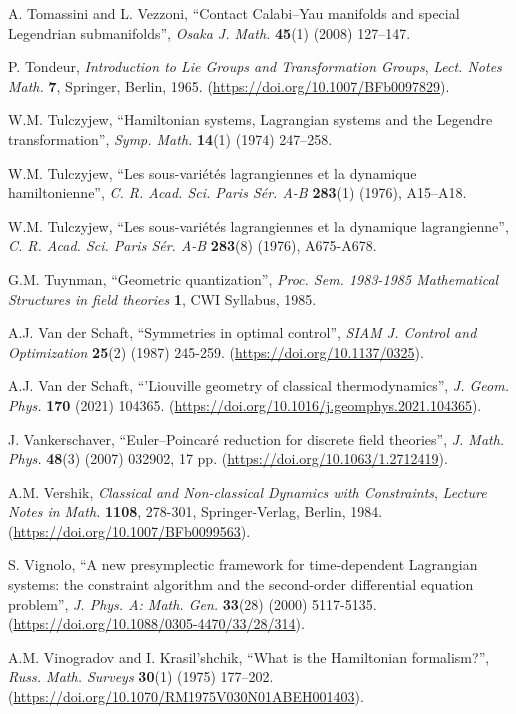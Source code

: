 \documentclass[12pt]{report}
\begin{document}
\begin{thebibliography}{999}
A. Tomassini and L. Vezzoni, 
``Contact Calabi--Yau manifolds and special Legendrian submanifolds'',
{\sl Osaka J. Math.} {\bf 45}(1) (2008) 127--147.

P. Tondeur, {\it Introduction to Lie Groups and Transformation Groups}, {\sl Lect. Notes Math.} {\bf 7}, Springer, Berlin, 1965.
(\url{https://doi.org/10.1007/BFb0097829}).

W.M. Tulczyjew, 
``Hamiltonian systems, Lagrangian systems and the Legendre transformation'',
{\sl Symp. Math.} {\bf 14}(1) (1974) 247--258. 

W.M. Tulczyjew, 
``Les sous-vari\'et\'es lagrangiennes et la dynamique hamiltonienne'',
{\sl C. R. Acad. Sci. Paris S\'er. A-B} {\bf 283}(1) (1976), A15--A18. 

W.M. Tulczyjew, 
``Les sous-vari\'et\'es lagrangiennes et la dynamique lagrangienne'',
{\sl C. R. Acad. Sci. Paris S\'er. A-B} {\bf 283}(8) (1976), A675-A678. 

G.M. Tuynman,
``Geometric quantization'',
{\sl Proc. Sem. 1983-1985 Mathematical Structures in field theories}
{\bf 1}, CWI Syllabus, 1985.

A.J. Van der Schaft, 
``Symmetries in optimal control'', 
{\sl SIAM J. Control and Optimization} {\bf 25}(2) (1987) 245-259.
(\url{https://doi.org/10.1137/0325}).

A.J. Van der Schaft, 
``'Liouville geometry of classical thermodynamics'',
{\sl J. Geom. Phys.} {\bf 170} (2021) 104365.
(\url{https://doi.org/10.1016/j.geomphys.2021.104365}).

J. Vankerschaver,
 ``Euler--Poincar\'e reduction for discrete field theories'',
{\sl J. Math. Phys.} {\bf 48}(3) (2007) 032902, 17 pp.
(\url{https://doi.org/10.1063/1.2712419}).

A.M. Vershik, 
{\it Classical and Non-classical Dynamics with Constraints}, 
{\sl Lecture Notes in Math.} {\bf 1108}, 278-301,
Springer-Verlag, Berlin, 1984.
(\url{https://doi.org/10.1007/BFb0099563}).

S. Vignolo,
``A new presymplectic framework for time-dependent Lagrangian systems: the constraint algorithm and the second-order differential equation problem'',
{\sl J. Phys. A: Math. Gen.} {\bf 33}(28) (2000) 5117-5135.
(\url{https://doi.org/10.1088/0305-4470/33/28/314}).

A.M. Vinogradov and I. Krasil’shchik, 
``What is the Hamiltonian formalism?'',
{\sl Russ. Math. Surveys} {\bf 30}(1) (1975) 177--202.
(\url{https://doi.org/10.1070/RM1975V030N01ABEH001403}).


\end{thebibliography}
\end{document}

